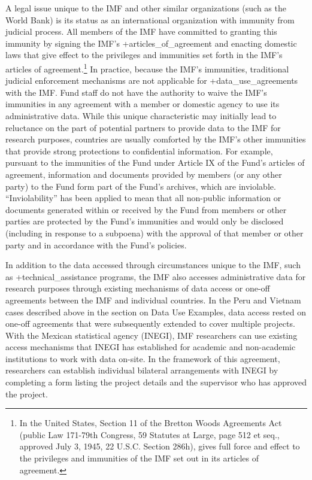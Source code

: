 \documentclass[
]{book}
\begin{document}
A legal issue unique to the IMF and other similar organizations (such as the World Bank) is its status as an international organization with immunity from judicial process. All members of the IMF have committed to granting this immunity by signing the IMF's +articles\_of\_agreement\textbar{} and enacting domestic laws that give effect to the privileges and immunities set forth in the IMF's articles of agreement.\footnote{In the United States, Section 11 of the Bretton Woods Agreements Act (public Law 171-79th Congress, 59 Statutes at Large, page 512 et seq., approved July 3, 1945, 22 U.S.C. Section 286h), gives full force and effect to the privileges and immunities of the IMF set out in its articles of agreement.} In practice, because the IMF's immunities, traditional judicial enforcement mechanisms are not applicable for +data\_use\_agreements\textbar{} with the IMF. Fund staff do not have the authority to waive the IMF's immunities in any agreement with a member or domestic agency to use its administrative data. While this unique characteristic may initially lead to reluctance on the part of potential partners to provide data to the IMF for research purposes, countries are usually comforted by the IMF's other immunities that provide strong protections to confidential information. For example, pursuant to the immunities of the Fund under Article IX of the Fund's articles of agreement, information and documents provided by members (or any other party) to the Fund form part of the Fund's archives, which are inviolable. ``Inviolability'' has been applied to mean that all non-public information or documents generated within or received by the Fund from members or other parties are protected by the Fund's immunities and would only be disclosed (including in response to a subpoena) with the approval of that member or other party and in accordance with the Fund's policies.

In addition to the data accessed through circumstances unique to the IMF, such as +technical\_assistance\textbar{} programs, the IMF also accesses administrative data for research purposes through existing mechanisms of data access or one-off agreements between the IMF and individual countries. In the Peru and Vietnam cases described above in the section on Data Use Examples, data access rested on one-off agreements that were subsequently extended to cover multiple projects. With the Mexican statistical agency (INEGI), IMF researchers can use existing access mechanisms that INEGI has established for academic and non-academic institutions to work with data on-site. In the framework of this agreement, researchers can establish individual bilateral arrangements with INEGI by completing a form listing the project details and the supervisor who has approved the project.
\end{document}
